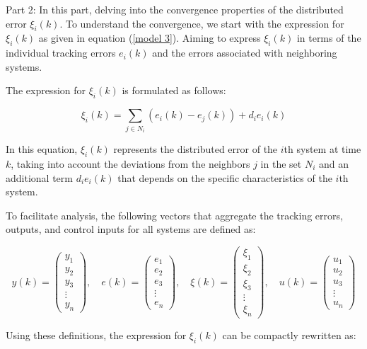 \documentclass[journal,onecolumn]{IEEEtran}
\begin{document}
Part 2: In this part, delving into the convergence properties of the distributed error \(\xi_i(k)\). To understand the convergence, we start with the expression for \(\xi_i(k)\) as given in equation (\ref{model 3}). Aiming to express \(\xi_i(k)\) in terms of the individual tracking errors \(e_i(k)\) and the errors associated with neighboring systems.

The expression for \(\xi_i(k)\) is formulated as follows:

\begin{equation}
    \label{model 27}
    \xi_i(k) = \sum_{j \in N_i} (e_i(k) - e_j(k)) + d_i e_i(k)
\end{equation}

In this equation, \(\xi_i(k)\) represents the distributed error of the $i$th system at time \(k\), taking into account the deviations from the neighbors \(j\) in the set \(N_i\) and an additional term \(d_i e_i(k)\) that depends on the specific characteristics of the $i$th system.

To facilitate analysis, the following vectors that aggregate the tracking errors, outputs, and control inputs for all systems are defined as:

\[
y(k) = \begin{pmatrix} y_1 \\ y_2 \\ y_3 \\ \vdots \\ y_n \end{pmatrix}, \quad 
e(k) = \begin{pmatrix} e_1 \\ e_2 \\ e_3 \\ \vdots \\ e_n \end{pmatrix}, \quad 
\xi(k) = \begin{pmatrix} \xi_1 \\ \xi_2 \\ \xi_3 \\ \vdots \\ \xi_n \end{pmatrix}, \quad 
u(k) = \begin{pmatrix} u_1 \\ u_2 \\ u_3 \\ \vdots \\ u_n \end{pmatrix}
\]

Using these definitions, the expression for \(\xi_i(k)\) can be compactly rewritten as:
\end{document}
